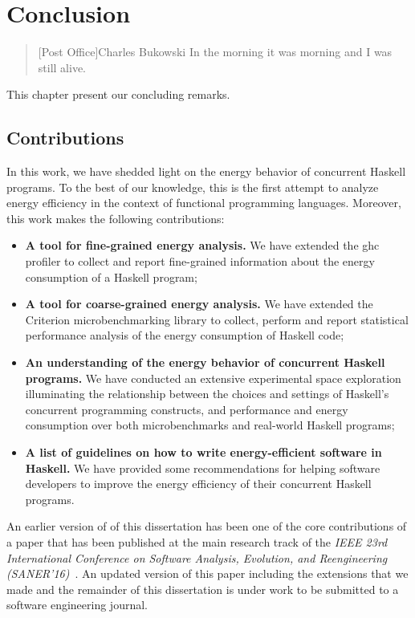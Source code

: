 \chapter{Conclusion}\label{chp:conclusion}

\begin{quotation}[Post Office]{Charles Bukowski}
In the morning it was morning and I was still alive.
\end{quotation}

This chapter present our concluding remarks.

\section{Contributions}
In this work, we have shedded light on the energy behavior of concurrent Haskell programs. To the best of our knowledge, this is the first attempt to analyze energy efficiency in the context of functional programming languages. Moreover, this work makes the following contributions:

\begin{itemize}
  \item \textbf{A tool for fine-grained energy analysis.} We have extended the \acs{ghc} profiler to collect and report fine-grained information about the energy consumption of a Haskell program;
  \item \textbf{A tool for coarse-grained energy analysis.} We have extended the Criterion microbenchmarking library to collect, perform and report statistical performance analysis of the energy consumption of Haskell code;
  \item \textbf{An understanding of the energy behavior of concurrent Haskell programs.} We have conducted an extensive experimental space exploration illuminating the relationship between the choices and settings of Haskell's concurrent programming constructs, and performance and energy consumption over both microbenchmarks and real-world Haskell programs;
  \item \textbf{A list of guidelines on how to write energy-efficient software in Haskell.} We have provided some recommendations for helping software developers to improve the energy efficiency of their concurrent Haskell programs.
\end{itemize}

An earlier version of \textbf{} of this dissertation has been one of the core contributions of a paper that has been published at the main research track of the \emph{IEEE 23rd International Conference on Software Analysis, Evolution, and Reengineering (SANER'16)}~\cite{lima:2016}. An updated version of this paper including the extensions that we made and the remainder of this dissertation is under work to be submitted to a software engineering journal.

